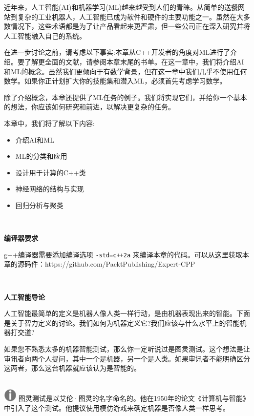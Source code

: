 近年来，人工智能(AI)和机器学习(ML)越来越受到人们的青睐。从简单的送餐网站到复杂的工业机器人，人工智能已成为软件和硬件的主要功能之一。虽然在大多数情况下，这些术语都是为了让产品看起来更严肃，但一些公司正在深入研究并将人工智能融入自己的系统。 \par
在进一步讨论之前，请考虑以下事实:本章从C++开发者的角度对ML进行了介绍。要了解更全面的文献，请参阅本章末尾的书单。在这一章中，我们将介绍AI和ML的概念。虽然我们更倾向于有数学背景，但在这一章中我们几乎不使用任何数学。如果你正计划扩大你的技能集和潜入ML，必须首先考虑学习数学。 \par
除了介绍概念，本章还提供了ML任务的例子。我们将实现它们，并给你一个基本的想法，你应该如何研究和前进，以解决更复杂的任务。 \par

本章中，我们将了解以下内容: \par

\begin{itemize}
	\item 介绍AI和ML
	\item ML的分类和应用
	\item 设计用于计算的C++类
	\item 神经网络的结构与实现
	\item 回归分析与聚类
\end{itemize}

\noindent\textbf{}\ \par
\textbf{编译器要求} \ \par
g++编译器需要添加编译选项 \texttt{-std=c++2a} 来编译本章的代码。可以从这里获取本章的源码件：https:/​/github.​com/PacktPublishing/Expert-CPP \par

\noindent\textbf{}\ \par
\textbf{人工智能导论} \ \par
人工智能最简单的定义是机器人像人类一样行动，是由机器表现出来的智能。下面是关于智力定义的讨论。我们如何为机器定义它?我们应该与什么水平上的智能机器打交道? \par
如果您不熟悉太多的机器智能测试，那么你一定听说过是图灵测试。这个想法是让审讯者向两个人提问，其中一个是机器，另一个是人类。如果审讯者不能明确区分这两者，那么这台机器就应该认为是智能的。 \par

\hspace*{\fill} \\ %
\includegraphics[width=0.05\textwidth]{images/warn}
图灵测试是以艾伦·图灵的名字命名的。他在1950年的论文《计算机与智能》中引入了这个测试。他提议使用模仿游戏来确定机器是否像人类一样思考。 \par
\noindent\textbf{}\ \par


